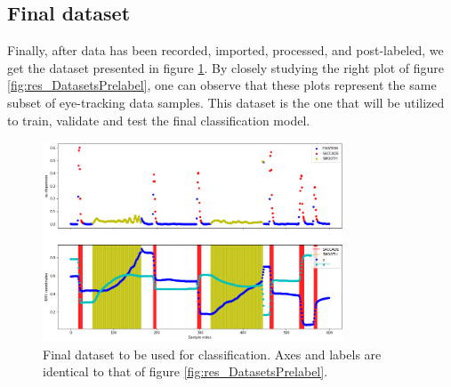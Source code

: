 
\subsection{Final dataset}

Finally, after data has been recorded, imported, processed, and post-labeled, we get the dataset presented in figure \ref{fig:res_DatasetFinal}. By closely studying the right plot of figure \ref{fig:res_DatasetsPrelabel}, one can observe that these plots represent the same subset of eye-tracking data samples. This dataset is the one that will be utilized to train, validate and test the final classification model.

\begin{figure}[h]
    \centering
    \includegraphics[width=0.8\textwidth]{Images/Dataset/DatasetFinal.png}
    \caption{Final dataset to be used for classification. Axes and labels are identical to that of figure \ref{fig:res_DatasetsPrelabel}.}
    \label{fig:res_DatasetFinal}
\end{figure}